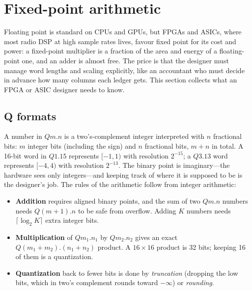 
\section{Fixed-point arithmetic}
\label{sec:ch06:fixed}

Floating point is standard on CPUs and GPUs, but FPGAs and ASICs, where most radio DSP at high sample
rates lives, favour fixed point for its cost and power: a fixed-point multiplier is a fraction of
the area and energy of a floating-point one, and an adder is almost free. The price is that the
designer must manage word lengths and scaling explicitly, like an accountant who must decide in
advance how many columns each ledger gets. This section collects what an FPGA or ASIC designer needs
to know.

\subsection{Q formats}

A number in  $Qm.n$ is a two's-complement integer interpreted with $n$ fractional
bits: $m$ integer bits (including the sign) and $n$ fractional bits, $m+n$ in total. A 16-bit word
in $Q1.15$ represents $[-1,1)$ with resolution $2^{-15}$; a $Q3.13$ word represents $[-4,4)$ with
resolution $2^{-13}$. The binary point is imaginary---the hardware sees only integers---and keeping
track of where it is supposed to be is the designer's job. The rules of the arithmetic follow from
integer arithmetic:
\begin{itemize}
\item \textbf{Addition} requires aligned binary points, and the sum of two $Qm.n$ numbers needs
$Q(m{+}1).n$ to be safe from overflow. Adding $K$ numbers needs $\lceil\log_2K\rceil$ extra
integer bits.
\item \textbf{Multiplication} of $Qm_1.n_1$ by $Qm_2.n_2$ gives an exact $Q(m_1{+}m_2).(n_1{+}n_2)$
product. A $16\times16$ product is 32 bits; keeping 16 of them is a quantization.
\item \textbf{Quantization} back to fewer bits is done by \emph{truncation} (dropping the low bits,
which in two's complement rounds toward $-\infty$) or \emph{rounding}.
\end{itemize}

